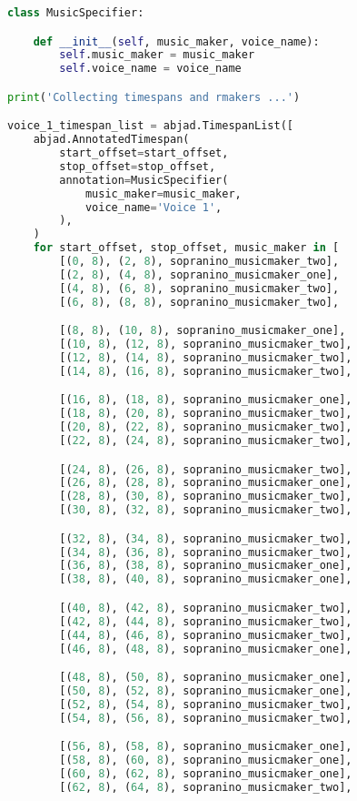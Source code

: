 \begin{lstlisting}[language=Python, caption=Invocation Source Code]
class MusicSpecifier:

    def __init__(self, music_maker, voice_name):
        self.music_maker = music_maker
        self.voice_name = voice_name

print('Collecting timespans and rmakers ...')

voice_1_timespan_list = abjad.TimespanList([
    abjad.AnnotatedTimespan(
        start_offset=start_offset,
        stop_offset=stop_offset,
        annotation=MusicSpecifier(
            music_maker=music_maker,
            voice_name='Voice 1',
        ),
    )
    for start_offset, stop_offset, music_maker in [
        [(0, 8), (2, 8), sopranino_musicmaker_two],
        [(2, 8), (4, 8), sopranino_musicmaker_one],
        [(4, 8), (6, 8), sopranino_musicmaker_two],
        [(6, 8), (8, 8), sopranino_musicmaker_two],

        [(8, 8), (10, 8), sopranino_musicmaker_one],
        [(10, 8), (12, 8), sopranino_musicmaker_two],
        [(12, 8), (14, 8), sopranino_musicmaker_two],
        [(14, 8), (16, 8), sopranino_musicmaker_two],

        [(16, 8), (18, 8), sopranino_musicmaker_one],
        [(18, 8), (20, 8), sopranino_musicmaker_two],
        [(20, 8), (22, 8), sopranino_musicmaker_two],
        [(22, 8), (24, 8), sopranino_musicmaker_two],

        [(24, 8), (26, 8), sopranino_musicmaker_two],
        [(26, 8), (28, 8), sopranino_musicmaker_one],
        [(28, 8), (30, 8), sopranino_musicmaker_two],
        [(30, 8), (32, 8), sopranino_musicmaker_two],

        [(32, 8), (34, 8), sopranino_musicmaker_two],
        [(34, 8), (36, 8), sopranino_musicmaker_two],
        [(36, 8), (38, 8), sopranino_musicmaker_one],
        [(38, 8), (40, 8), sopranino_musicmaker_one],

        [(40, 8), (42, 8), sopranino_musicmaker_two],
        [(42, 8), (44, 8), sopranino_musicmaker_two],
        [(44, 8), (46, 8), sopranino_musicmaker_two],
        [(46, 8), (48, 8), sopranino_musicmaker_one],

        [(48, 8), (50, 8), sopranino_musicmaker_one],
        [(50, 8), (52, 8), sopranino_musicmaker_one],
        [(52, 8), (54, 8), sopranino_musicmaker_two],
        [(54, 8), (56, 8), sopranino_musicmaker_two],

        [(56, 8), (58, 8), sopranino_musicmaker_one],
        [(58, 8), (60, 8), sopranino_musicmaker_one],
        [(60, 8), (62, 8), sopranino_musicmaker_one],
        [(62, 8), (64, 8), sopranino_musicmaker_two],


\end{lstlisting}
